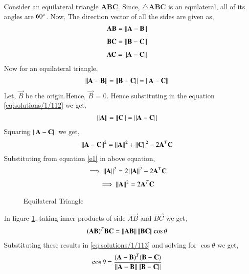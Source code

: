 Consider an equilateral triangle \textbf{ABC}. Since, $\triangle$\textbf{ABC} is an equilateral, all of its angles are $60\degree$. Now, The direction vector of all the sides are given as,
\begin{align}
\mathbf{AB}=\left\lVert\mathbf{A-B}\right\rVert
\end{align}
\begin{align}
\mathbf{BC}=\left\lVert\mathbf{B-C}\right\rVert
\end{align}  
\begin{align}
\mathbf{AC}=\left\lVert\mathbf{A-C}\right\rVert
\end{align} 
Now for an equilateral triangle,
\begin{align}
\left\lVert\mathbf{A-B}\right\rVert = \left\lVert\mathbf{B-C}\right\rVert = \left\lVert\mathbf{A-C}\right\rVert
\label{eq:solutions/1/112}
\end{align}
Let, $\vec{B}$ be the origin.Hence, $\vec{B}$ = 0. Hence substituting in the equation \eqref{eq:solutions/1/112} we get,
\begin{align}
\left\lVert\mathbf{A}\right\rVert = \left\lVert\mathbf{C}\right\rVert =\left\lVert\mathbf{A}-\mathbf{C}\right\rVert
\label{e1}
\end{align}
Squaring $\left\lVert\mathbf{A}-\mathbf{C}\right\rVert$ we get,
\begin{align}
\left\lVert\mathbf{A}-\mathbf{C}\right\rVert^2 = \left\lVert\mathbf{A}\right\rVert^2+\left\lVert\mathbf{C}\right\rVert^2-2\mathbf{A}^T\mathbf{C}
\end{align} 
Substituting from equation \eqref{e1} in above equation, 
\begin{align}
\implies \left\lVert\mathbf{A}\right\rVert^2 = 2\left\lVert\mathbf{A}\right\rVert^2-2\mathbf{A}^T\mathbf{C}
\end{align}
\begin{align}
\implies \left\lVert\mathbf{A}\right\rVert^2 = 2\mathbf{A}^T\mathbf{C}
\label{eq:solutions/1/114}
\end{align}
\renewcommand{\thefigure}{1}
\begin{figure}[!ht]
\centering
\resizebox{\columnwidth}{!}{}
\caption{Equilateral Triangle}
\label{fig:solutions/1/111}
\end{figure}
In figure \ref{fig:solutions/1/111}, taking inner products of side $\vec{AB}$ and $\vec{BC}$ we get,
\begin{align}
(\mathbf{AB})^T\mathbf{BC} = \left\lVert\mathbf{AB}\right\rVert\left\lVert\mathbf{BC}\right\rVert\cos\theta
\label{eq:solutions/1/113}
\end{align}
Substituting these results in \eqref{eq:solutions/1/113} and solving for $\cos\theta$ we get,
\begin{align}
\cos\theta = \frac{(\mathbf{A}-\mathbf{B})^T(\mathbf{B}-\mathbf{C})}{\left\lVert\mathbf{A}-\mathbf{B}\right\rVert\left\lVert\mathbf{B}-\mathbf{C}\right\rVert}
\end{align}
